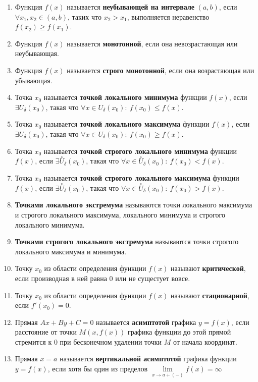 \begin{enumerate}
\item Функция $f(x)$ называется \textbf{неубывающей на интервале} $(a, b)$, если $\forall x_1, x_2 \in (a, b)$, таких что $x_2 > x_1$, выполняется неравенство $f(x_2)\geqslant f(x_1)$.
\item Функция $f(x)$ называется \textbf{монотонной}, если она невозрастающая или неубывающая.
\item Функция $f(x)$ называется \textbf{строго монотонной}, если она возрастающая или убывающая.
\item Точка $x_0$ называется \textbf{точкой локального минимума} функции $f(x)$, если $\exists U_{\delta}(x_0)$, такая что $\forall x \in U_{\delta}(x_0): \ f(x_0) \leqslant f(x)$.
\item Точка $x_0$ называется \textbf{точкой локального максимума} функции $f(x)$, если $\exists U_{\delta}(x_0)$, такая что $\forall x \in U_{\delta}(x_0): \ f(x_0) \geqslant f(x)$.
\item Точка $x_0$ называется \textbf{точкой строгого локального минимума} функции $f(x)$, если $\exists \overset{\circ}{U}_{\delta}(x_0)$, такая что $\forall x \in \overset{\circ}{U}_{\delta}(x_0): \ f(x_0) < f(x)$.
\item Точка $x_0$ называется \textbf{точкой строгого локального максимума} функции $f(x)$, если $\exists \overset{\circ}{U}_\delta(x_0)$, такая что $\forall x \in \overset{\circ}{U}_\delta(x_0): \ f(x_0) > f(x)$.
\item \textbf{Точками локального экстремума} называются точки локального максимума и строгого локального максимума, локального минимума и строгого локального минимума.
\item \textbf{Точками строгого локального экстремума} называются точки строгого локального максимума и минимума.
\item Точку $x_0$ из области определения функции $f(x)$ называют \textbf{критической}, если производная в ней равна 0 или не сущестует вовсе.
\item Точку $x_0$ из области определения функции $f(x)$ называют \textbf{стационарной}, если $f'(x_0) = 0$.
\item Прямая $Ax + By + C = 0$ называется \textbf{асимптотой} графика $y = f(x)$, если расстояние от точки $M(x, f(x))$ графика функции до этой прямой стремится к 0 при бесконечном удалении точки $M$ от начала координат.
\item Прямая $x = a$ называется \textbf{вертикальной асимптотой} графика функции $y = f(x)$, если хотя бы один из пределов $\lim\limits_{x \to a+(-)}f(x) = \infty$

\end{enumerate}
